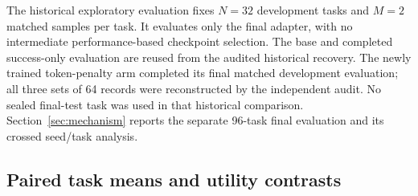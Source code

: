 \documentclass[11pt]{article}
\begin{document}
The historical exploratory evaluation fixes $N=32$ development tasks and $M=2$ matched samples per task. It evaluates only the final adapter, with no intermediate performance-based checkpoint selection. The base and completed success-only evaluation are reused from the audited historical recovery. The newly trained token-penalty arm completed its final matched development evaluation; all three sets of 64 records were reconstructed by the independent audit. No sealed final-test task was used in that historical comparison. Section~\ref{sec:mechanism} reports the separate 96-task final evaluation and its crossed seed/task analysis.

\subsection{Paired task means and utility contrasts}
\end{document}
